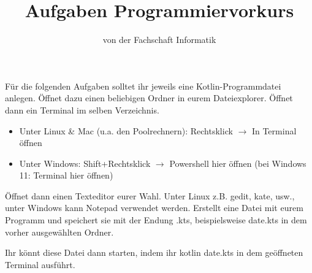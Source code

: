 
\title{Aufgaben Programmiervorkurs}
\subtitle{von der Fachschaft Informatik\hfill\ptitle}

\usepackage{enumitem}


\maketitle{}

Für die folgenden Aufgaben solltet ihr jeweils eine Kotlin-Programmdatei
anlegen. Öffnet dazu einen beliebigen Ordner in eurem Dateiexplorer. Öffnet
dann ein Terminal im selben Verzeichnis.

\begin{itemize}
    \item Unter Linux \& Mac (u.a. den Poolrechnern): Rechtsklick $\to$ In Terminal öffnen
    \item Unter Windows: Shift+Rechtsklick $\to$ Powershell hier öffnen (bei Windows 11: Terminal hier öffnen)
\end{itemize}

Öffnet dann einen Texteditor eurer Wahl. Unter Linux z.B. {\ttfamily gedit, kate, usw.}, unter
Windows kann Notepad verwendet werden. Erstellt eine Datei mit eurem Programm
und speichert sie mit der Endung {\ttfamily.kts}, beispielsweise {\ttfamily date.kts}
in dem vorher ausgewählten Ordner.

Ihr könnt diese Datei dann starten, indem ihr {\ttfamily kotlin date.kts} in dem geöffneten Terminal ausführt.

